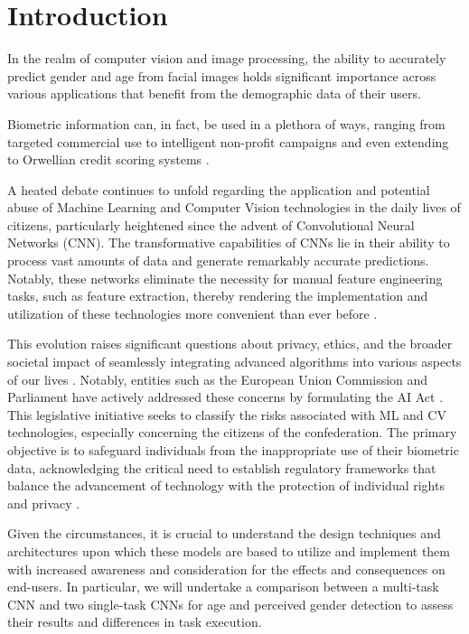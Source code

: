 \section{Introduction} \label{sec:introduction}
In the realm of computer vision and image processing,
the ability to accurately predict gender and age from facial
images holds significant importance across various applications that benefit
from the demographic data of their users.

Biometric information can, in fact, be used in a plethora of ways,
ranging from targeted commercial use \cite{int1} to intelligent non-profit campaigns \cite{int2}
and even extending to Orwellian credit scoring systems \cite{int3}.

A heated debate continues to unfold regarding the application
and potential abuse of Machine Learning and Computer Vision
technologies in the daily lives of citizens, particularly heightened
since the advent of Convolutional Neural Networks (CNN).
The transformative capabilities of CNNs lie in their ability to process
vast amounts of data and generate remarkably accurate predictions.
Notably, these networks eliminate the necessity for manual feature
engineering tasks, such as feature extraction, thereby rendering the
implementation and utilization of these technologies more convenient than
ever before \cite{int6}. 

This evolution raises significant questions about privacy, ethics, and
the broader societal impact of seamlessly integrating advanced algorithms
into various aspects of our lives \cite{int7}. 
Notably, entities such as the European Union Commission and Parliament
have actively addressed these concerns by formulating the AI Act \cite{int4}.
This legislative initiative seeks to classify the risks associated with
ML and CV technologies, especially concerning the citizens of the
confederation. The primary objective is to safeguard individuals
from the inappropriate use of their biometric data, acknowledging
the critical need to establish regulatory frameworks that balance
the advancement of technology with the protection of individual
rights and privacy  \cite{int5}.

Given the circumstances, it is crucial to understand the design
techniques and architectures upon which these models are based
to utilize and implement them with increased awareness and
consideration for the effects and consequences on end-users.
In particular, we will undertake a comparison between a multi-task
CNN and two single-task CNNs for
age and perceived gender detection to assess their results and
differences in task execution.